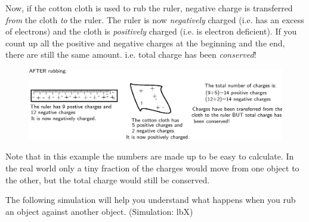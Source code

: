       \par 
      \label{m38780*id200783}Now, if the cotton cloth is used to rub the ruler, negative charge
is transferred \textsl{from} the cloth \textsl{to} the ruler.
The ruler is now \textsl{negatively} charged (i.e. has an excess of electrons) and the cloth is \textsl{positively} charged (i.e. is electron deficient).
If you count up all the positive and negative charges at the beginning and the end, there are still the same amount. i.e. total charge has been \textsl{conserved}!\par 
      \label{m38780*id200814}
    \setcounter{subfigure}{0}
	\begin{figure}[H] %
    \begin{center}
    \label{m38780*id200819!!!underscore!!!media}\label{m38780*id200819!!!underscore!!!printimage}\includegraphics[width=0.8\columnwidth]{col11305.imgs/m38780_PG10C8_003.png} %
      \vspace{2pt}
    \vspace{.1in}
    \end{center}
 \end{figure}       
      \par 
      \label{m38780*id200825}Note that in this example the numbers are made up to be easy to calculate. In the real world only a tiny fraction of the charges would move from one object to the other, but the total charge would still be conserved.\par \label{m38780*eip-600}The following simulation will help you understand what happens when you rub an object against another object.  {(Simulation: lbX)}    \par \label{m38780*eip-567}
